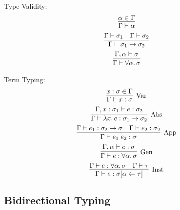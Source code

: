 Type Validity:
\begin{gather*}
  \infer{
    \Gamma \vdash \alpha
  }{
    \alpha \in \Gamma
  }
  \\
  \infer{
    \Gamma \vdash \sigma_1 \to \sigma_2
  }{
    \Gamma \vdash \sigma_1
    &
    \Gamma \vdash \sigma_2
  }
  \\
  \infer{
    \Gamma \vdash \forall \alpha\ldotp \sigma
  }{
    \Gamma, \alpha \vdash \sigma
  }
\end{gather*}

Term Typing:
\begin{gather*}
  \infer[\text{Var}]{
    \Gamma \vdash x: \sigma
  }{
    x:\sigma \in \Gamma
  }
  \\
  \infer[\text{Abs}]{
    \Gamma \vdash \lambda x\ldotp e: \sigma_1 \to \sigma_2
  }{
    \Gamma, x: \sigma_1\vdash e: \sigma_2
  }
  \\
  \infer[\text{App}]{
    \Gamma \vdash e_1\; e_2: \sigma
  }{
    \Gamma \vdash e_1: \sigma_2 \to \sigma
    &
    \Gamma \vdash e_2: \sigma_2
  }
  \\
  \infer[\text{Gen}]{
    \Gamma \vdash e: \forall \alpha\ldotp \sigma
  }{
    \Gamma, \alpha \vdash e: \sigma
  }
  \\
  \infer[\text{Inst}]{
    \Gamma \vdash e: \sigma[\alpha \assign \tau]
  }{
    \Gamma \vdash e: \forall \alpha\ldotp \sigma
    &
    \Gamma \vdash \tau
  }
\end{gather*}

\subsection{Bidirectional Typing}


